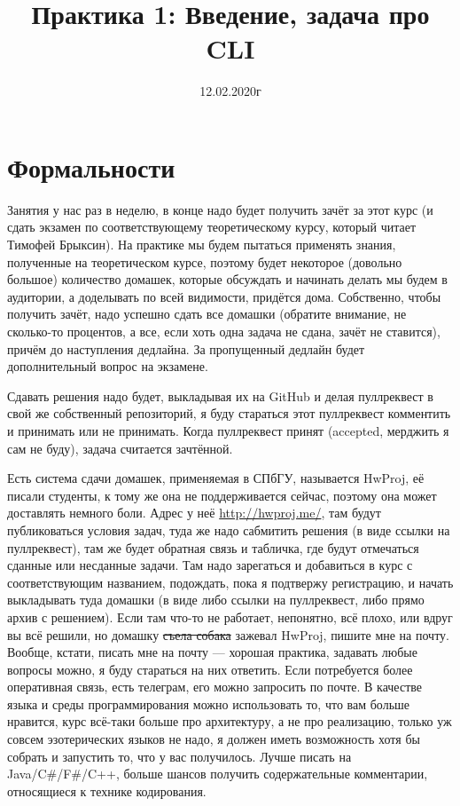 \documentclass[a5paper]{article}
\title{Практика 1: Введение, задача про CLI}
\date{12.02.2020г}
\begin{document}
\maketitle
\thispagestyle{empty}

\section{Формальности}
Занятия у нас раз в неделю, в конце надо будет получить зачёт за этот курс (и сдать экзамен по соответствующему теоретическому курсу, который читает Тимофей Брыксин). На практике мы будем пытаться применять знания, полученные на теоретическом курсе, поэтому будет некоторое (довольно большое) количество домашек, которые обсуждать и начинать делать мы будем в аудитории, а доделывать по всей видимости, придётся дома. Собственно, чтобы получить зачёт, надо успешно сдать все домашки (обратите внимание, не сколько-то процентов, а все, если хоть одна задача не сдана, зачёт не ставится), причём до наступления дедлайна. За пропущенный дедлайн будет дополнительный вопрос на экзамене.

Сдавать решения надо будет, выкладывая их на GitHub и делая пуллреквест в свой же собственный репозиторий, я буду стараться этот пуллреквест комментить и принимать или не принимать. Когда пуллреквест принят (accepted, мерджить я сам не буду), задача считается зачтённой.

Есть система сдачи домашек, применяемая в СПбГУ, называется HwProj, её писали студенты, к тому же она не поддерживается сейчас, поэтому она может доставлять немного боли. Адрес у неё \url{http://hwproj.me/}, там будут публиковаться условия задач, туда же надо сабмитить решения (в виде ссылки на пуллреквест), там же будет обратная связь и табличка, где будут отмечаться сданные или несданные задачи. Там надо зарегаться и добавиться в курс с соответствующим названием, подождать, пока я подтвержу регистрацию, и начать выкладывать туда домашки (в виде либо ссылки на пуллреквест, либо прямо архив с решением). Если там что-то не работает, непонятно, всё плохо, или вдруг вы всё решили, но домашку \sout{съела собака} зажевал HwProj, пишите мне на почту. Вообще, кстати, писать мне на почту --- хорошая практика, задавать любые вопросы можно, я буду стараться на них ответить. Если потребуется более оперативная связь, есть телеграм, его можно запросить по почте. В качестве языка и среды программирования можно использовать то, что вам больше нравится, курс всё-таки больше про архитектуру, а не про реализацию, только уж совсем эзотерических языков не надо, я должен иметь возможность хотя бы собрать и запустить то, что у вас получилось. Лучше писать на Java/C\#/F\#/C++, больше шансов получить содержательные комментарии, относящиеся к технике кодирования.
\end{document}
